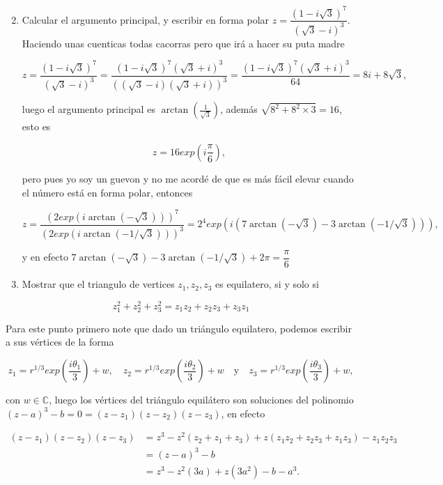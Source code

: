 \documentclass[11pt]{article}
\begin{document}
\begin{enumerate}
  \setcounter{enumi}{1}
  \item Calcular el argumento principal, y escribir en forma polar $z=\dfrac{(1-i \sqrt{3})^{7}}{(\sqrt{3}-i)^{3}}$.\\

Haciendo unas cuenticas todas cacorras pero que irá a hacer su puta madre

$$z = \frac{(1 - i \sqrt{3})^7}{(\sqrt{3} - i)^3} = \frac{(1 - i \sqrt{3})^7 (\sqrt{3} + i)^3}{((\sqrt{3} - i)(\sqrt{3} + i))^3} = \frac{(1 - i \sqrt{3})^7 (\sqrt{3} + i)^3}{64} = 8i + 8\sqrt{3},
$$

luego el argumento principal es $\arctan\left(\displaystyle\frac{1}{\sqrt{3}}\right)$, además $\sqrt{8^2+8^2\times 3}=16$, esto es

$$z=16exp\left(i\frac{\pi}{6}\right),$$

pero pues yo soy un guevon y no me acordé de que es más fácil elevar cuando el número está en forma polar, entonces

$$z=\frac{(2exp(i\arctan(-\sqrt{3})))^7}{(2exp(i\arctan(-1/\sqrt{3})))^3}=2^4exp(i(7\arctan(-\sqrt{3})-3\arctan(-1/\sqrt{3}))),$$
 
 y en efecto $7\arctan(-\sqrt{3})-3\arctan(-1/\sqrt{3})+2\pi=\dfrac{\pi}{6}$

  \item Mostrar que el triangulo de vertices $z_{1}, z_{2}, z_{3}$ es equilatero, si y solo si
\end{enumerate}

$$
z_{1}^{2}+z_{2}^{2}+z_{3}^{2}=z_{1} z_{2}+z_{2} z_{3}+z_{3} z_{1}
$$

Para este punto primero note que dado un triángulo equilatero, podemos escribir a sus vértices de la forma

$$z_1=r^{1/3}exp\left(\dfrac{i\theta_1}{3}\right)+w, \quad z_2=r^{1/3}exp\left(\dfrac{i\theta_2}{3}\right)+w \quad \text{y}\quad z_3=r^{1/3}exp\left(\dfrac{i\theta_3}{3}\right)+w,$$

con $w\in \mathbb{C}$, luego los vértices del triángulo equilátero son soluciones del polinomio $(z-a)^3-b=0=(z-z_1)(z-z_2)(z-z_3)$, en efecto

\begin{align*}
  (z-z_1)(z-z_2)(z-z_3)&=z^3-z^2(z_2+z_1+z_3)+z(z_1z_2+z_2z_3+z_1z_3)-z_1z_2z_3\\
  &=(z-a)^3-b\\
  &=z^3-z^2(3a)+z(3a^2)-b-a^3
.\end{align*}
\end{document}

